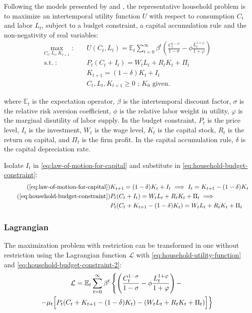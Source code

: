 \documentclass[
	12pt,
	]{article}
\numberwithin{equation}{section}
\DeclareMathOperator{\st}{s.t.}
\newcommand{\E}[1][t]{{\mathbb{E}_{#1}}}
\theoremstyle{definition}
\theoremstyle{plain}
\theoremstyle{plain}
\theoremstyle{plain}
\begin{document}
Following the models presented by \textcite{costa_junior_understanding_2016} and \textcite{solis-garcia_ucb_2022}, the representative household problem is to maximize an intertemporal utility function $U$ with respect to consumption $C_t$ and labor $L_t$, subject to a budget constraint, a capital accumulation rule and the non-negativity of real variables:
\begin{align}
\label{eq:household-utility-function}
	\max_{C_t,L_t,K_{t+1}}: \quad & U(C_t,L_t) = \E \sum_{t=0}^{\infty} \beta^t \left(\frac{C_t^{1-\sigma}}{1-\sigma} - \phi \frac{L_t^{1+\varphi}}{1+\varphi} \right) \\
\label{eq:household-budget-constraint}
	\st: \quad & P_t (C_t + I_t) = W_t L_t + R_t K_t + \Pi_t \\
\label{eq:law-of-motion-for-capital}
	\quad & K_{t+1} = (1-\delta)K_t + I_t \\
	\quad & C_t,L_t,K_{t+1} \geq 0 \text{ ; $K_0$ given.} \nonumber
\end{align}

where $\E$ is the expectation operator, $\beta$ is the intertemporal discount factor, $\sigma$ is the relative risk aversion coefficient, $\phi$ is the relative labor weight in utility, $\varphi$ is the marginal disutility of labor supply. In the budget constraint, $P_t$ is the price level, $I_t$ is the investment, $W_t$ is the wage level, $K_t$ is the capital stock, $R_t$ is the return on capital, and $\Pi_t$ is the firm profit. In the capital accumulation rule, $\delta$ is the capital depreciation rate.

Isolate $I_t$ in \ref{eq:law-of-motion-for-capital} and substitute in \ref{eq:household-budget-constraint}:
\begin{align}
\tag{\ref{eq:law-of-motion-for-capital}}
	& K_{t+1} = (1-\delta)K_t + I_t \implies I_t = K_{t+1} - (1-\delta)K_t \\
\tag{\ref{eq:household-budget-constraint}}
	& P_t (C_t + I_t) = W_t L_t + R_t K_t + \Pi_t \implies \\
\label{eq:household-budget-constraint-2}
	& P_t (C_t + K_{t+1} - (1-\delta)K_t) = W_t L_t + R_t K_t + \Pi_t
\end{align}

\subsubsection*{Lagrangian}

The maximization problem with restriction can be transformed in one without restriction using the Lagrangian function $\mathcal{L}$ with \ref{eq:household-utility-function} and \ref{eq:household-budget-constraint-2}:
\begin{multline}
\label{eq:household-lagrangian}
	\mathcal{L} = \mathbb{E}_t \sum_{t=0}^{\infty} \beta^t 
	\left\{ \left( \frac{C_t^{1-\sigma}}{1-\sigma} - \phi \frac{L_t^{1+\varphi}}{1+\varphi} \right) - \right.
\\
	\left. -\mu_t \Bigr[ P_t (C_t + K_{t+1} - (1-\delta) K_t) - (W_t L_t + R_t K_t + \Pi_t) \Bigl] \right\}
\end{multline}
\end{document}
